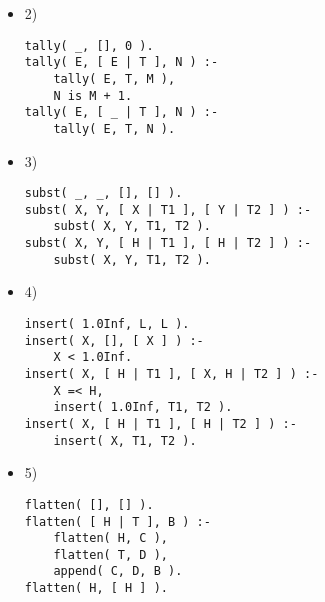 \documentclass[ 12pt ]{article}
\begin{document}
\begin{itemize}
	\item[] {\large 2)}
	\begin{center}
	\begin{lstlisting}
tally( _, [], 0 ).
tally( E, [ E | T ], N ) :-
    tally( E, T, M ),
	N is M + 1.
tally( E, [ _ | T ], N ) :-
	tally( E, T, N ).
	\end{lstlisting}
	\end{center}

	\item[] {\large 3)}
	\begin{center}
	\begin{lstlisting}
subst( _, _, [], [] ).
subst( X, Y, [ X | T1 ], [ Y | T2 ] ) :-
	subst( X, Y, T1, T2 ).
subst( X, Y, [ H | T1 ], [ H | T2 ] ) :-
	subst( X, Y, T1, T2 ).
	\end{lstlisting}
	\end{center}

	\item[] {\large 4)}
	\begin{center}
	\begin{lstlisting}
insert( 1.0Inf, L, L ).
insert( X, [], [ X ] ) :-
	X < 1.0Inf.
insert( X, [ H | T1 ], [ X, H | T2 ] ) :-
	X =< H,
	insert( 1.0Inf, T1, T2 ).
insert( X, [ H | T1 ], [ H | T2 ] ) :-
	insert( X, T1, T2 ).
	\end{lstlisting}
	\end{center}

	\item[] {\large 5)}
	\begin{center}
	\begin{lstlisting}
flatten( [], [] ).
flatten( [ H | T ], B ) :-
	flatten( H, C ),
	flatten( T, D ),
	append( C, D, B ).
flatten( H, [ H ] ).
	\end{lstlisting}
	\end{center}
\end{itemize}
\end{document}
